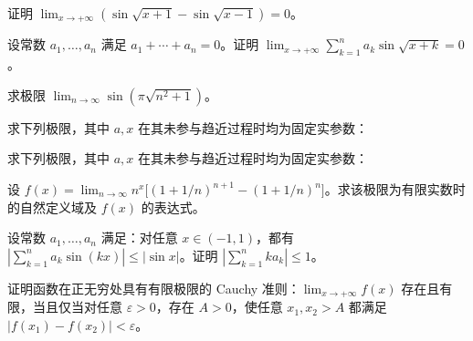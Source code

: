 \newpage
\noindent\begin{minipage}{\textwidth}
证明 $\lim_{x\to+\infty}(\sin\sqrt{x+1}-\sin\sqrt{x-1})=0$。
\end{minipage}\par\vfill
\noindent\begin{minipage}{\textwidth}
设常数 $a_1,\ldots,a_n$ 满足 $a_1+\cdots+a_n=0$。证明 $\lim_{x\to+\infty}\sum_{k=1}^n a_k\sin\sqrt{x+k}=0$。
\end{minipage}\par\vfill
\noindent\begin{minipage}{\textwidth}
求极限 $\lim_{n\to\infty}\sin(\pi\sqrt{n^2+1})$。
\end{minipage}\par\vfill
\newpage
\noindent\begin{minipage}{\textwidth}
求下列极限，其中 $a,x$ 在其未参与趋近过程时均为固定实参数：
\end{minipage}\par\vfill
\noindent\begin{minipage}{\textwidth}
求下列极限，其中 $a,x$ 在其未参与趋近过程时均为固定实参数：
\end{minipage}\par\vfill
\noindent\begin{minipage}{\textwidth}
设 $f(x)=\lim_{n\to\infty}n^x\bigl[(1+1/n)^{n+1}-(1+1/n)^n\bigr]$。求该极限为有限实数时的自然定义域及 $f(x)$ 的表达式。
\end{minipage}\par\vfill
\newpage
\noindent\begin{minipage}{\textwidth}
设常数 $a_1,\ldots,a_n$ 满足：对任意 $x\in(-1,1)$，都有 $\left|\sum_{k=1}^n a_k\sin(kx)\right|\le|\sin x|$。证明 $\left|\sum_{k=1}^n ka_k\right|\le1$。
\end{minipage}\par\vfill
\noindent\begin{minipage}{\textwidth}
证明函数在正无穷处具有有限极限的 Cauchy 准则：$\lim_{x\to+\infty}f(x)$ 存在且有限，当且仅当对任意 $\varepsilon>0$，存在 $A>0$，使任意 $x_1,x_2>A$ 都满足 $|f(x_1)-f(x_2)|<\varepsilon$。
\end{minipage}\par\vfill
